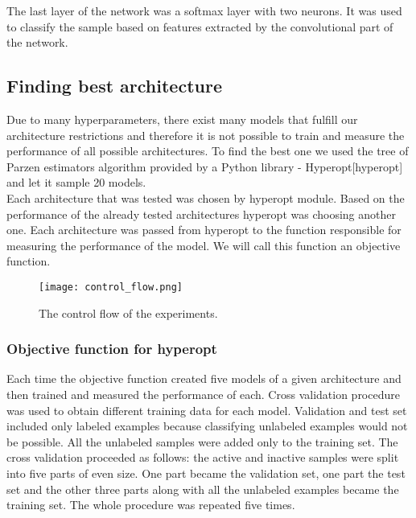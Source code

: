 \documentclass[a4paper,10pt]{report}
\begin{document}
      The last layer of the network was a softmax layer with two neurons. It was used to classify the sample based on features extracted by the convolutional part of the network.\\
      
	\subsection{Finding best architecture}
	Due to many hyperparameters, there exist many models that fulfill our architecture restrictions and therefore it is not possible to train and measure the performance of all possible architectures. To find the best one we used the tree of Parzen estimators algorithm provided by a Python library - Hyperopt[hyperopt] and let it sample 20 models.\\
	
	
	Each architecture that was tested was chosen by hyperopt module. Based on the performance of the already tested architectures hyperopt was choosing another one. Each architecture was passed from hyperopt to the function responsible for measuring the performance of the model. We will call this function an objective function.\\
	
	 \begin{figure}[h!]
	  \centering
	  \texttt{[image: control\_flow.png]}
	  \caption{The control flow of the experiments.}
	  \label{fig:control_flow}
	\end{figure} 
	
	\subsubsection{Objective function for hyperopt}
	Each time the objective function created five models of a given architecture and then trained and measured the performance of each. Cross validation procedure was used to obtain different training data for each model. Validation and test set included only labeled examples because classifying unlabeled examples would not be possible. All the unlabeled samples were added only to the training set. The cross validation proceeded as follows: the active and inactive samples were split into five parts of even size. One part became the validation set, one part the test set and the other three parts along with all the unlabeled examples became the training set. The whole procedure was repeated five times.\\
	
\end{document}
